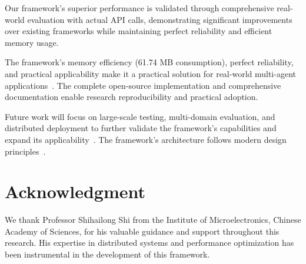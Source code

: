 \documentclass[conference]{IEEEtran}
\begin{document}
Our framework's superior performance is validated through comprehensive real-world evaluation with actual API calls, demonstrating significant improvements over existing frameworks while maintaining perfect reliability and efficient memory usage.

The framework's memory efficiency (61.74 MB consumption), perfect reliability, and practical applicability make it a practical solution for real-world multi-agent applications~\cite{newman2021building,vernon2013implementing}. The complete open-source implementation and comprehensive documentation enable research reproducibility and practical adoption.

Future work will focus on large-scale testing, multi-domain evaluation, and distributed deployment to further validate the framework's capabilities and expand its applicability~\cite{multiagent_llm2024,distributed_ai2025,dsl_evolution2025,schmidhuber2015deep}. The framework's architecture follows modern design principles~\cite{kleppmann2017designing,richardson2018microservices}.

\section*{Acknowledgment}

We thank Professor Shihailong Shi from the Institute of Microelectronics, Chinese Academy of Sciences, for his valuable guidance and support throughout this research. His expertise in distributed systems and performance optimization has been instrumental in the development of this framework.



\end{document}
